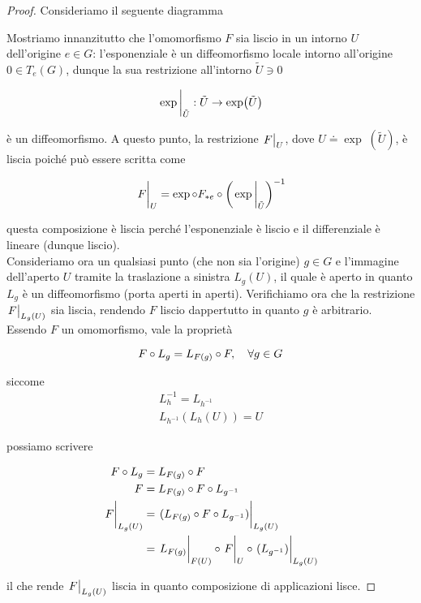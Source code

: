 \begin{proof}
	Consideriamo il seguente diagramma
	
	
	Mostriamo innanzitutto che l'omomorfismo $ F $ sia liscio in un intorno $ U $ dell'origine $ e \in G $: l'esponenziale è un diffeomorfismo locale intorno all'origine $ 0 \in T_{e}(G) $, dunque la sua restrizione all'intorno $ \tilde{U} \ni 0 $
	
	\begin{equation}
		\eval{\exp}_{\tilde{U}} : \tilde{U} \to \exp(\tilde{U})
	\end{equation}

	è un diffeomorfismo. A questo punto, la restrizione $ \eval{F}_{U} $, dove $ U \doteq \exp \!\; (\tilde{U}) $, è liscia poiché può essere scritta come
	
	\begin{equation}
		\eval{F}_{U} = \exp \circ F_{*e} \circ \left( \eval{\exp}_{\tilde{U}} \right)^{-1}
	\end{equation}

	questa composizione è liscia perché l'esponenziale è liscio e il differenziale è lineare (dunque liscio).\\
	Consideriamo ora un qualsiasi punto (che non sia l'origine) $ g \in G $ e l'immagine dell'aperto $ U $ tramite la traslazione a sinistra $ L_{g}(U) $, il quale è aperto in quanto $ L_{g} $ è un diffeomorfismo (porta aperti in aperti). Verifichiamo ora che la restrizione $ \eval{F}_{L_{g}(U)} $ sia liscia, rendendo $ F $ liscio dappertutto in quanto $ g $ è arbitrario.\\
	Essendo $ F $ un omomorfismo, vale la proprietà
	
	\begin{equation}
		F \circ L_{g} = L_{F(g)} \circ F \qcomma \forall g \in G
	\end{equation}

	siccome
	\begin{gather}
		L_{h}^{-1} = L_{h^{-1}} \\
		L_{h^{-1}} (L_{h}(U)) = U
	\end{gather}

	possiamo scrivere
	
	\begin{align}
		\begin{split}
			F \circ L_{g} &= L_{F(g)} \circ F \\
			F &= L_{F(g)} \circ F \circ L_{g^{-1}} \\
			\eval{F}_{L_{g}(U)} &= \eval{ (L_{F(g)} \circ F \circ L_{g^{-1}}) }_{L_{g}(U)} \\
			&= \eval{L_{F(g)}}_{F(U)} \circ \eval{F}_{U} \circ \eval{ (L_{g^{-1}}) }_{L_{g}(U)}
		\end{split}
	\end{align}

	il che rende $ \eval{F}_{L_{g}(U)} $ liscia in quanto composizione di applicazioni lisce.
\end{proof}

